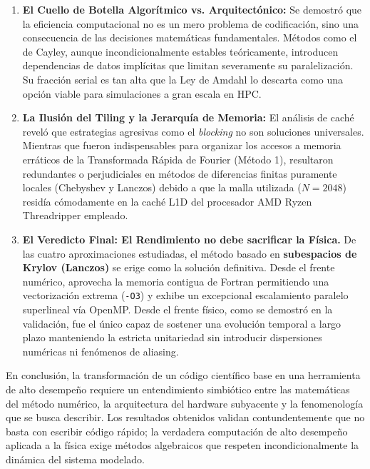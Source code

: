 \documentclass[12pt, a4paper]{article}
\begin{document}
\begin{enumerate}
    \item \textbf{El Cuello de Botella Algorítmico vs. Arquitectónico:} Se demostró que la eficiencia computacional no es un mero problema de codificación, sino una consecuencia de las decisiones matemáticas fundamentales. Métodos como el de Cayley, aunque incondicionalmente estables teóricamente, introducen dependencias de datos implícitas que limitan severamente su paralelización. Su fracción serial es tan alta que la Ley de Amdahl lo descarta como una opción viable para simulaciones a gran escala en HPC.
    
    \item \textbf{La Ilusión del Tiling y la Jerarquía de Memoria:} El análisis de caché reveló que estrategias agresivas como el \textit{blocking} no son soluciones universales. Mientras que fueron indispensables para organizar los accesos a memoria erráticos de la Transformada Rápida de Fourier (Método 1), resultaron redundantes o perjudiciales en métodos de diferencias finitas puramente locales (Chebyshev y Lanczos) debido a que la malla utilizada ($N=2048$) residía cómodamente en la caché L1D del procesador AMD Ryzen Threadripper empleado.
    
    \item \textbf{El Veredicto Final: El Rendimiento no debe sacrificar la Física.} De las cuatro aproximaciones estudiadas, el método basado en \textbf{subespacios de Krylov (Lanczos)} se erige como la solución definitiva. Desde el frente numérico, aprovecha la memoria contigua de Fortran permitiendo una vectorización extrema (\texttt{-O3}) y exhibe un excepcional escalamiento paralelo superlineal vía OpenMP. Desde el frente físico, como se demostró en la validación, fue el único capaz de sostener una evolución temporal a largo plazo manteniendo la estricta unitariedad sin introducir dispersiones numéricas ni fenómenos de aliasing.
\end{enumerate}

En conclusión, la transformación de un código científico base en una herramienta de alto desempeño requiere un entendimiento simbiótico entre las matemáticas del método numérico, la arquitectura del hardware subyacente y la fenomenología que se busca describir. Los resultados obtenidos validan contundentemente que no basta con escribir código rápido; la verdadera computación de alto desempeño aplicada a la física exige métodos algebraicos que respeten incondicionalmente la dinámica del sistema modelado.
\end{document}
